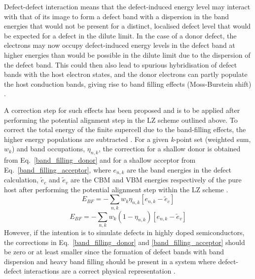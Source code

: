 \documentclass[11pt, twoside]{report}
\begin{document}
Defect-defect interaction means that the defect-induced energy level may interact with that of its image to form a defect band with a dispersion in the band energies that would not be present for a distinct, localised defect level that would be expected for a defect in the dilute limit. In the case of a donor defect, the electrons may now occupy defect-induced energy levels in the defect band at higher energies than would be possible in the dilute limit due to the dispersion of the defect band. This could then also lead to spurious hybridisation of defect bands with the host electron states, and the donor electrons can partly populate the host conduction bands, giving rise to band filling effects (Moss-Burstein shift) \cite{Lany_defects_2008}.

A correction step for such effects has been proposed \cite{CIS_defects, Lany_defects_2008, Lany_defects} and is to be applied after performing the potential alignment step in the LZ scheme outlined above.
To correct the total energy of the finite supercell due to the band-filling effects, the higher energy populations are subtracted \cite{CIS_defects}.
For a given \textit{k}-point set (weighted sum, $w_k$) and band occupations, $\eta_{n,k}$, the correction for a shallow donor is obtained from Eq.~\ref{band_filling_donor} and for a shallow acceptor from Eq.~\ref{band_filling_acceptor}, where $e_{n,k}$ are the band energies in the defect calculation, $\tilde{e}_c$ and $\tilde{e}_v$ are the CBM and VBM energies respectively of the pure host after performing the potential alignment step within the LZ scheme \cite{pylada}.
\begin{equation}\label{band_filling_donor}
E_{BF} = - \sum_{n,k} w_k \eta_{n,k} [e_{n,k} - \tilde{e}_c]
\end{equation}
\begin{equation}\label{band_filling_acceptor}
E_{BF} = - \sum_{n,k} w_k (1 - \eta_{n,k}) [e_{n,k} - \tilde{e}_v]
\end{equation}
However, if the intention is to simulate defects in highly doped semiconductors, the corrections in Eq.~\ref{band_filling_donor} and \ref{band_filling_acceptor} should be zero or at least smaller since the formation of defect bands with band dispersion and heavy band filling should be present in a system where defect-defect interactions are a correct physical representation \cite{CIS_defects}.
\end{document}
